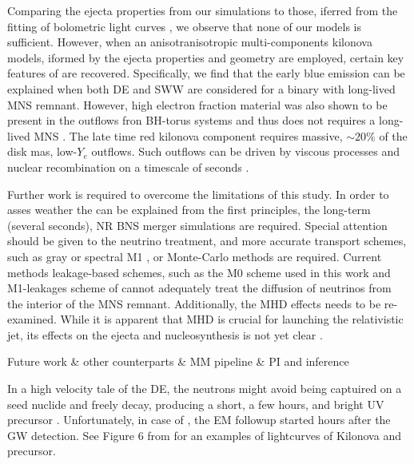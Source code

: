 Comparing the ejecta properties from our simulations to those, iferred from the 
fitting of \AT{} bolometric light curves \citep{Villar:2017wcc}, 
we observe that none of our models is sufficient. 
However, when an anisotranisotropic multi-components kilonova models, iformed by the 
ejecta properties and geometry are employed, certain key features of \AT{} are recovered.
Specifically, we find that the early blue emission can be explained 
when both \ac{DE} and \ac{SWW} are considered for a binary with long-lived \ac{MNS} remnant.
However, high electron fraction material was also shown to be present in the outflows 
fron \ac{BH}-torus systems and thus does not requires a long-lived \ac{MNS} 
\citep{Fujibayashi:2020qda}.
The late time red kilonova component requires massive, ${\sim}20\%$ of the disk mas, 
low-$Y_e$ outflows. Such outflows can be driven by viscous processes and nuclear recombination 
on a timescale of seconds \citep[\eg][]{Metzger:2008av}.

Further work is required to overcome the limitations of this study.
In order to asses weather the \AT{}  can be explained from the 
first principles, the long-term (several seconds), \ac{NR} \ac{BNS} merger simulations
are required. Special attention should be given to the neutrino treatment, and more 
accurate transport schemes, such as gray or spectral M1 \citep{Foucart:2016rxm,Roberts:2016lzn},
or Monte-Carlo methods are required. Current methods leakage-based schemes, such as 
the M0 scheme used in this work and M1-leakages scheme of \citet{Sekiguchi:2015dma,Fujibayashi:2017puw}
cannot adequately treat the diffusion of neutrinos from the interior of the \ac{MNS} remnant.
Additionally, the \ac{MHD} effects needs to be re-examined. While it is 
apparent that \ac{MHD} is crucial for launching the relativistic jet, its effects on the 
ejecta and nucleosynthesis is not yet clear \citep{Siegel:2017jug, Fernandez:2018kax}.


Future work \& other counterparts \& MM pipeline \& PI and inference

%
In a high velocity tale of the \ac{DE}, the neutrons might avoid being captuired on a seed nuclide and freely 
decay, producing a short, a few hours, and bright \ac{UV} precursor \citep{Metzger:2014yda}. 
Unfortunately, in case of \AT{}, the \ac{EM} followup started  hours after the \ac{GW} detection.
%
See Figure 6 from \cite{Metzger:2016pju} for an examples of lightcurves of Kilonova and precursor.